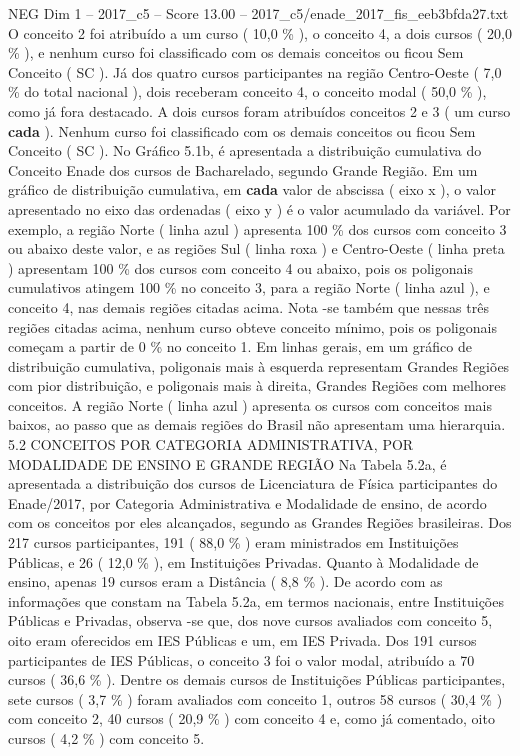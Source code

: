 \begin{textsample}{NEG Dim 1 – 2017\_c5 – Score 13.00 – 2017\_c5/enade\_2017\_fis\_eeb3bfda27.txt}
O conceito 2 foi atribuído a um curso ( 10,0 \% ), o conceito 4, a dois cursos ( 20,0 \% ), e nenhum curso foi classificado com os demais conceitos ou ficou Sem Conceito ( SC ).
Já dos quatro cursos participantes na região Centro-Oeste ( 7,0 \% do total nacional ), dois receberam conceito 4, o conceito modal ( 50,0 \% ), como já fora destacado.
A dois cursos foram atribuídos conceitos 2 e 3 ( um curso \textbf{cada} ).
Nenhum curso foi classificado com os demais conceitos ou ficou Sem Conceito ( SC ).
No Gráfico 5.1b, é apresentada a distribuição cumulativa do Conceito Enade dos cursos de Bacharelado, segundo Grande Região.
Em um gráfico de distribuição cumulativa, em \textbf{cada} valor de abscissa ( eixo x ), o valor apresentado no eixo das ordenadas ( eixo y ) é o valor acumulado da variável.
Por exemplo, a região Norte ( linha azul ) apresenta 100 \% dos cursos com conceito 3 ou abaixo deste valor, e as regiões Sul ( linha roxa ) e Centro-Oeste ( linha preta ) apresentam 100 \% dos cursos com conceito 4 ou abaixo, pois os poligonais cumulativos atingem 100 \% no conceito 3, para a região Norte ( linha azul ), e conceito 4, nas demais regiões citadas acima.
Nota -se também que nessas três regiões citadas acima, nenhum curso obteve conceito mínimo, pois os poligonais começam a partir de 0 \% no conceito 1.
Em linhas gerais, em um gráfico de distribuição cumulativa, poligonais mais à esquerda representam Grandes Regiões com pior distribuição, e poligonais mais à direita, Grandes Regiões com melhores conceitos.
A região Norte ( linha azul ) apresenta os cursos com conceitos mais baixos, ao passo que as demais regiões do Brasil não apresentam uma hierarquia. 5.2 CONCEITOS POR CATEGORIA ADMINISTRATIVA, POR MODALIDADE DE ENSINO E GRANDE REGIÃO Na Tabela 5.2a, é apresentada a distribuição dos cursos de Licenciatura de Física participantes do Enade/2017, por Categoria Administrativa e Modalidade de ensino, de acordo com os conceitos por eles alcançados, segundo as Grandes Regiões brasileiras.
Dos 217 cursos participantes, 191 ( 88,0 \% ) eram ministrados em Instituições Públicas, e 26 ( 12,0 \% ), em Instituições Privadas.
Quanto à Modalidade de ensino, apenas 19 cursos eram a Distância ( 8,8 \% ).
De acordo com as informações que constam na Tabela 5.2a, em termos nacionais, entre Instituições Públicas e Privadas, observa -se que, dos nove cursos avaliados com conceito 5, oito eram oferecidos em IES Públicas e um, em IES Privada.
Dos 191 cursos participantes de IES Públicas, o conceito 3 foi o valor modal, atribuído a 70 cursos ( 36,6 \% ).
Dentre os demais cursos de Instituições Públicas participantes, sete cursos ( 3,7 \% ) foram avaliados com conceito 1, outros 58 cursos ( 30,4 \% ) com conceito 2, 40 cursos ( 20,9 \% ) com conceito 4 e, como já comentado, oito cursos ( 4,2 \% ) com conceito 5.

\end{textsample}
